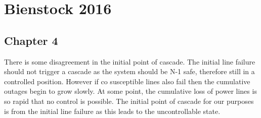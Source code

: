 \documentclass{article}
\begin{document}
\section{Bienstock 2016}
\subsection{Chapter 4}

There is some disagreement in the initial point of cascade. The initial line failure should not trigger a cascade as the system should be N-1 safe, therefore still in a controlled position. However if co susceptible lines also fail then the cumulative outages begin to grow slowly. At some point, the cumulative loss of power lines is so rapid that no control is possible. The initial point of cascade for our purposes is from the initial line failure as this leads to the uncontrollable state.
\end{document}
